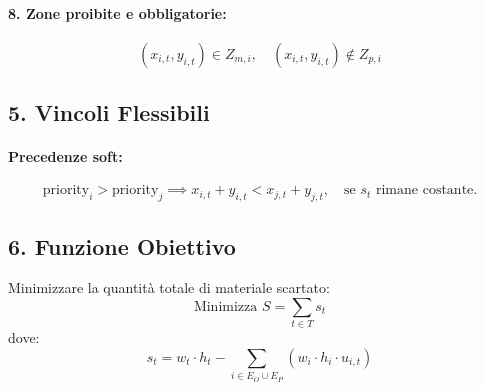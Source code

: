 \paragraph*{8. Zone proibite e obbligatorie:}
\[
(x_{i,t}, y_{i,t}) \in Z_{m,i}, \quad (x_{i,t}, y_{i,t}) \not\in Z_{p,i}
\]

\subsection*{5. Vincoli Flessibili}

\paragraph*{Precedenze soft:}
\[
\text{priority}_i > \text{priority}_j \implies x_{i,t} + y_{i,t} < x_{j,t} + y_{j,t}, \quad \text{se } s_t \text{ rimane costante.}
\]

\subsection*{6. Funzione Obiettivo}
Minimizzare la quantità totale di materiale scartato:
\[
\text{Minimizza } S = \sum_{t \in T} s_t
\]
dove:
\[
s_t = w_t \cdot h_t - \sum_{i \in E_O \cup E_P} (w_i \cdot h_i \cdot u_{i,t})
\]







